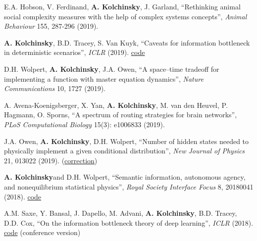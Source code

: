 E.A. Hobson, V. Ferdinand, \textbf{A. Kolchinsky}, J. Garland, ``Rethinking animal social complexity measures with the help of complex systems concepts'', \emph{Animal Behaviour} 155, 287-296 (2019).  

\textbf{A. Kolchinsky}\CA, B.D. Tracey, S. Van Kuyk, ``Caveats for information bottleneck in deterministic scenarios'', \emph{ICLR} (2019).  \href{https://github.com/artemyk/ibcurve}{code} 

D.H. Wolpert, \textbf{A. Kolchinsky}, J.A. Owen, ``A space–time tradeoff for implementing a function with master equation dynamics'', \emph{Nature Communications} 10, 1727 (2019).  

A. Avena-Koenigsberger, X. Yan, \textbf{A. Kolchinsky}, M. van den Heuvel, P. Hagmann, O. Sporns, ``A spectrum of routing strategies for brain networks'', \emph{PLoS Computational Biology} 15(3): e1006833 (2019).  

J.A. Owen, \textbf{A. Kolchinsky}, D.H. Wolpert, ``Number of hidden states needed to physically implement a given conditional distribution'', \emph{New Journal of Physics} 21, 013022 (2019).   (\href{https://iopscience.iop.org/article/10.1088/1367-2630/ab60f8}{correction})

\textbf{A. Kolchinsky}\CA and D.H. Wolpert, ``Semantic information, autonomous agency, and nonequilibrium statistical physics'', \emph{Royal Society Interface Focus} 8, 20180041 (2018).  \href{https://github.com/artemyk/semantic_information/}{code} 

A.M. Saxe, Y. Bansal, J. Dapello, M. Advani, \textbf{A. Kolchinsky}, B.D. Tracey, D.D. Cox, ``On the information bottleneck theory of deep learning'', \emph{ICLR} (2018).  \href{https://github.com/artemyk/ibsgd/tree/iclr2018}{code}  (conference version)

